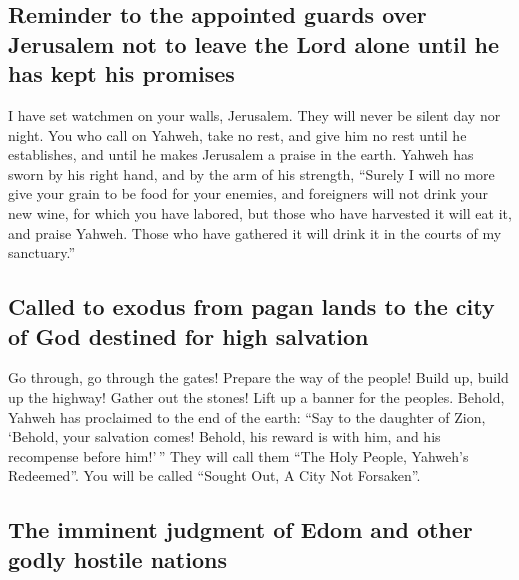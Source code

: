 \hypertarget{reminder-to-the-appointed-guards-over-jerusalem-not-to-leave-the-lord-alone-until-he-has-kept-his-promises}{%
\subsection{Reminder to the appointed guards over Jerusalem not to leave
the Lord alone until he has kept his
promises}\label{reminder-to-the-appointed-guards-over-jerusalem-not-to-leave-the-lord-alone-until-he-has-kept-his-promises}}

 I have set watchmen on your walls, Jerusalem. They will
never be silent day nor night. You who call on Yahweh, take no rest,
 and give him no rest until he establishes, and until he
makes Jerusalem a praise in the earth.  Yahweh has sworn
by his right hand, and by the arm of his strength, ``Surely I will no
more give your grain to be food for your enemies, and foreigners will
not drink your new wine, for which you have labored,  but
those who have harvested it will eat it, and praise Yahweh. Those who
have gathered it will drink it in the courts of my sanctuary.''

\hypertarget{called-to-exodus-from-pagan-lands-to-the-city-of-god-destined-for-high-salvation}{%
\subsection{Called to exodus from pagan lands to the city of God
destined for high
salvation}\label{called-to-exodus-from-pagan-lands-to-the-city-of-god-destined-for-high-salvation}}

 Go through, go through the gates! Prepare the way of the
people! Build up, build up the highway! Gather out the stones! Lift up a
banner for the peoples.  Behold, Yahweh has proclaimed to
the end of the earth: ``Say to the daughter of Zion, `Behold, your
salvation comes! Behold, his reward is with him, and his recompense
before him!'\,''  They will call them ``The Holy People,
Yahweh's Redeemed''. You will be called ``Sought Out, A City Not
Forsaken''.

\hypertarget{the-imminent-judgment-of-edom-and-other-godly-hostile-nations}{%
\subsection{The imminent judgment of Edom and other godly hostile
nations}\label{the-imminent-judgment-of-edom-and-other-godly-hostile-nations}}

